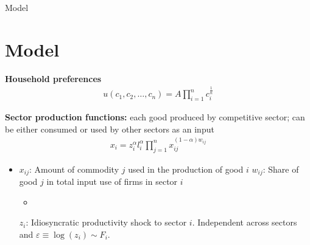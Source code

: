 \documentclass[dvipsnames]{beamer}
\begin{document}
\begin{frame}{Model}
  
\section{Model}

{\bf Household preferences} 
\begin{align*}
  u(c_1,c_2,\ldots ,c_n)=A \prod \limits_{i=1}^n c_i^{\frac{1}{n}}
\end{align*}

{\bf Sector production functions:} each good produced by competitive sector; can be either consumed or used by other sectors as an input
\begin{align*}
  x_i=z_i^\alpha l_i^\alpha \prod \limits_{j=1}^n x_{ij}^{(1-\alpha)w_{ij}}
\end{align*}

\begin{itemize}
  \item $x_{ij}$: Amount of commodity $j$ used in the production of good $i$
  \vitem $w_{ij}$: Share of good $j$ in total input use of firms in sector $i$
    \begin{itemize}
    \item 
    \end{itemize}
  \vitem $z_i$: Idiosyncratic productivity shock to sector $i$. Independent across
  sectors and  $\varepsilon \equiv \log(z_i) \sim F_i$.
\end{itemize}
\end{frame}
%
\end{document}
